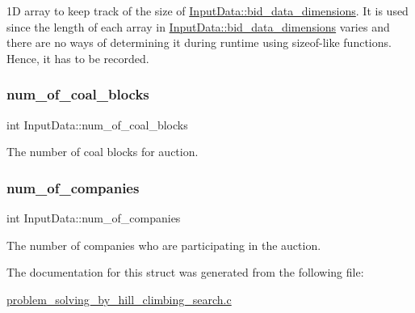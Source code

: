 1D array to keep track of the size of \hyperlink{structInputData_abb16dba9ad2a732ace6dab1b1c9dec33}{Input\+Data\+::bid\+\_\+data\+\_\+dimensions}. It is used since the length of each array in \hyperlink{structInputData_abb16dba9ad2a732ace6dab1b1c9dec33}{Input\+Data\+::bid\+\_\+data\+\_\+dimensions} varies and there are no ways of determining it during runtime using sizeof-\/like functions. Hence, it has to be recorded. \mbox{\label{structInputData_a8da16cc608de69e099958cfdd162af5a}} 
\subsubsection{\texorpdfstring{num\+\_\+of\+\_\+coal\+\_\+blocks}{num\_of\_coal\_blocks}}
{\footnotesize\ttfamily int Input\+Data\+::num\+\_\+of\+\_\+coal\+\_\+blocks}

The number of coal blocks for auction. \mbox{\label{structInputData_a8b59f6e5325366bc964a42071441fa90}} 
\subsubsection{\texorpdfstring{num\+\_\+of\+\_\+companies}{num\_of\_companies}}
{\footnotesize\ttfamily int Input\+Data\+::num\+\_\+of\+\_\+companies}

The number of companies who are participating in the auction. 

The documentation for this struct was generated from the following file\+:\begin{DoxyCompactItemize}
\item 
\hyperlink{problem__solving__by__hill__climbing__search_8c}{problem\+\_\+solving\+\_\+by\+\_\+hill\+\_\+climbing\+\_\+search.\+c}\end{DoxyCompactItemize}

